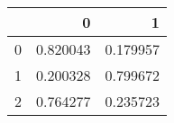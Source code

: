 \begin{tabular}{lrr}
\toprule
 & 0 & 1 \\
\midrule
0 & 0.820043 & 0.179957 \\
1 & 0.200328 & 0.799672 \\
2 & 0.764277 & 0.235723 \\
\bottomrule
\end{tabular}
